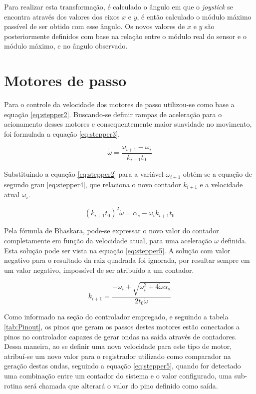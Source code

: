Para realizar esta transformação, é calculado o ângulo em que o \textit{joystick}
se encontra através dos valores dos eixos $x$ e $y$, é então calculado o módulo máximo 
passível de ser obtido com esse ângulo. Os novos valores de $x$ e $y$ são posteriormente
definidos com base na relação entre o módulo real do sensor e o módulo máximo, e no 
ângulo observado.

\section{Motores de passo}

Para o controle da velocidade dos motores de passo utilizou-se como base a equação
\ref{eq:stepper2}. Buscando-se definir rampas de aceleração para o acionamento
desses motores e consequentemente maior suavidade no movimento, foi formulada a equação 
\ref{eq:stepper3}.

\begin{equation}
    \label{eq:stepper3}
    \dot{\omega} = \frac{\omega_{i+1}-\omega_i}{k_{i+1}t_0}
\end{equation}

Substituindo a equação \ref{eq:stepper2} para a variável $\omega_{i+1}$
obtém-se a equação de segundo grau \ref{eq:stepper4}, que relaciona o novo 
contador $k_{i+1}$ e a velocidade atual $\omega_i$.

\begin{equation}
    \label{eq:stepper4}
    (k_{i+1}t_0)^2\dot{\omega} = \alpha_s - \omega_ik_{i+1}t_0
\end{equation}

Pela fórmula de Bhaskara, pode-se expressar o novo valor do contador completamente
em função da velocidade atual, para uma aceleração $\dot{\omega}$ definida. Esta 
solução pode ser vista na equação \ref{eq:stepper5}. A solução com valor negativo
para o resultado da raiz quadrada foi ignorada, por resultar sempre em um valor negativo,
impossível de ser atribuído a um contador.

\begin{equation}
    \label{eq:stepper5}
    k_{i+1} = \frac{-\omega_i + \sqrt{\omega_i^2+4\dot{\omega}\alpha_s}}{2t_0\dot{\omega}}
\end{equation}

Como informado na seção do controlador empregado, e seguindo a tabela \ref{tab:Pinout}, os 
pinos que geram os passos destes motores estão conectados a pinos no controlador capazes de 
gerar ondas na saída através de contadores. Dessa maneira, ao se definir uma nova 
velocidade para este tipo de motor, atribuí-se um novo valor para o registrador utilizado 
como comparador na geração destas ondas, seguindo a equação \ref{eq:stepper5}, quando for
detectado uma combinação entre um contador do sistema e o valor configurado, uma sub-rotina
será chamada que alterará o valor do pino definido como saída.

